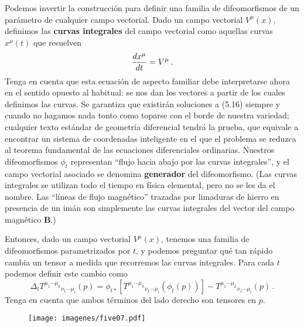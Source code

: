 \documentclass[11pt,b5paper,openany,twoside]{book}
\begin{document}
Podemos invertir la construcción para definir una familia de difeomorfismos de un parámetro de cualquier campo vectorial.
Dado un campo vectorial $V^\mu(x)$, definimos las {\bf curvas integrales} del campo vectorial como aquellas curvas $x^\mu(t)$ que resuelven
\begin{equation}
{{dx^\mu}\over {dt}}=V^\mu\,.\label{5.16}
\end{equation}
Tenga en cuenta que esta ecuación de aspecto familiar debe interpretarse ahora en el sentido opuesto al habitual: se nos dan los vectores a partir de los cuales definimos las curvas.
Se garantiza que existirán soluciones a (5.16) siempre y cuando no hagamos nada tonto como toparse con el borde de nuestra variedad; cualquier texto estándar de geometría diferencial tendrá la prueba, que equivale a encontrar un sistema de coordenadas inteligente en el que el problema se reduzca al teorema fundamental de las ecuaciones diferenciales ordinarias.
Nuestros difeomorfismos $\phi_t$ representan ``flujo hacia abajo por las curvas integrales'', y el campo vectorial asociado se denomina {\bf generador} del difeomorfismo.
(Las curvas integrales se utilizan todo el tiempo en física elemental, pero no se les da el nombre.
Las ``líneas de flujo magnético'' trazadas por limaduras de hierro en presencia de un imán son simplemente las curvas integrales del vector del campo magnético {\bf B}.)

Entonces, dado un campo vectorial $V^\mu(x)$, tenemos una familia de difeomorfismos parametrizados por $t$, y podemos preguntar qué tan rápido cambia un tensor a medida que recorremos las curvas integrales.
Para cada $t$ podemos definir este cambio como
\begin{equation}
\Delta_t T^{\mu_1 \cdots \mu_k}{}_{\nu_1 \cdots \mu_l}(p)
= \phi_{t*}[T^{\mu_1 \cdots \mu_k}{}_{\nu_1 \cdots \mu_l}(\phi_t(p))]
- T^{\mu_1 \cdots \mu_k}{}_{\nu_1 \cdots \mu_l}(p)\,.\label{5.17}
\end{equation}
Tenga en cuenta que ambos términos del lado derecho son tensores en $p$.

\begin{figure}[h]
\centering
\texttt{[image: imagenes/five07.pdf]}
\end{figure}
\end{document}
